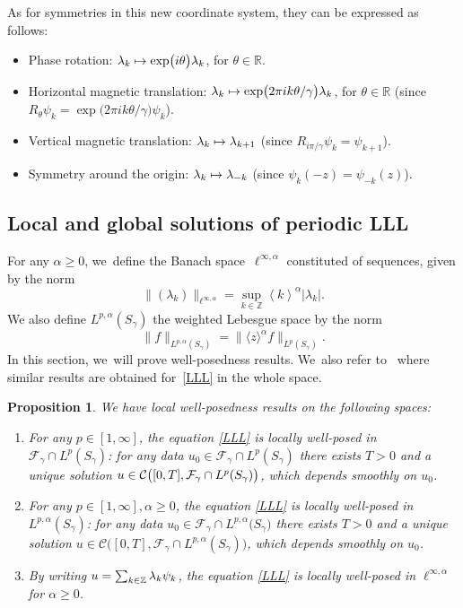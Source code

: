 \documentclass[JEP,XML,SOM,Unicode,NoFloatCountersInSection,published]{cedram}
\newcommand\mto{\mathchoice{\longmapsto}{\mapsto}{\mapsto}{\mapsto}}
\newtheorem{prop}[theorem]{Proposition}
\theoremstyle{definition}
\let\EE\exp
\let\dis\relax
\let\<\langle
\let\>\rangle
\newcommand\Z{\mathbb Z}
\newcommand{\bra}[1]{\left\langle #1 \right\rangle}
\begin{document}
As for symmetries in this new coordinate system, they can be expressed as follows:
\begin{itemize}
\item Phase rotation: $\lambda_k \mto \EE\bigl({i\theta}\bigr) \lambda_k$, for $\theta\in \mathbb{R}$.
\item Horizontal magnetic translation: $\dis \lambda_k \mto \EE\bigl({2\pi i k \theta}/{\gamma}\bigr) \lambda_k$, for $\theta \in \mathbb{R}$ (since $R_\theta \psi_k = \EE\bigl({2\pi i k \theta/ \gamma}\bigr) \psi_k$).
\item Vertical magnetic translation: $\lambda_k \mto \lambda_{k+1}$ (since $R_{{i\pi}/{\gamma}} \psi_k = \psi_{k+1}$).
\item Symmetry around the origin: $\lambda_k \mto \lambda_{-k}$ (since $\psi_k(-z) = \psi_{-k}(z)$).
\end{itemize}

\subsection{Local and global solutions of periodic LLL}

For any $\alpha \geq 0$, we~define the Banach space~$\ell^{\infty,\alpha}$ constituted of sequences, given by the norm
\[
\|(\lambda_k)\|_{\ell^{\infty,\alpha}} = \sup_{k\in\mathbb{Z}} \bra{k}^\alpha |\lambda_k|.
\]
We also define $L^{p, \alpha}(S_\gamma)$ the weighted Lebesgue space by the norm
\[
\|f\|_{L^{p,\alpha}(S_\gamma)} = \|\< z\>^\alpha f\|_{L^p(S_\gamma)}.
\]
In this section, we~will prove well-posedness results. We~also refer to~\cite[\S 3]{GGT} where similar results are obtained for~\eqref{LLL} in the whole space.

\begin{prop}\label{LWP}
We have local well-posedness results on the following spaces:
\begin{enumerate}
\item\label{LWPi} For any $p \in [1,\infty]$, the equation \eqref{LLL} is locally well-posed in $\mathcal{F}_{\gamma} \cap L^p(S_{\gamma})$: for any data $u_0 \in \mathcal{F}_{\gamma} \cap L^p(S_{\gamma})$ there exists $T > 0$ and a unique solution $u \in \mathcal{C}\bigl([0, T], \mathcal{F}_{\gamma} \cap\nobreak L^p(S_{\gamma})\bigr)$, which depends smoothly on $u_0$.
\item\label{LWPii} For any $p \in [1,\infty], \alpha \geq 0$, the equation \eqref{LLL} is locally well-posed in $L^{p,\alpha}(S_{\gamma})$: for any data $u_0 \in \mathcal{F}_{\gamma} \cap L^{p,\alpha}\bigl(S_{\gamma}\bigr)$ there exists $T > 0$ and a unique solution $u \in \mathcal{C}\bigl([0, T], \mathcal{F}_{\gamma} \cap L^{p,\alpha}(S_\gamma)\bigr)$, which depends smoothly on $u_0$.
\item\label{LWPiii} By writing $\dis u= \sum_{k\in\Z} \lambda_k\psi_k$, the equation \eqref{LLL} is locally well-posed in $\ell^{\infty,\alpha}$ for $\alpha \geq 0$.
\end{enumerate}
\end{prop}
\end{document}
